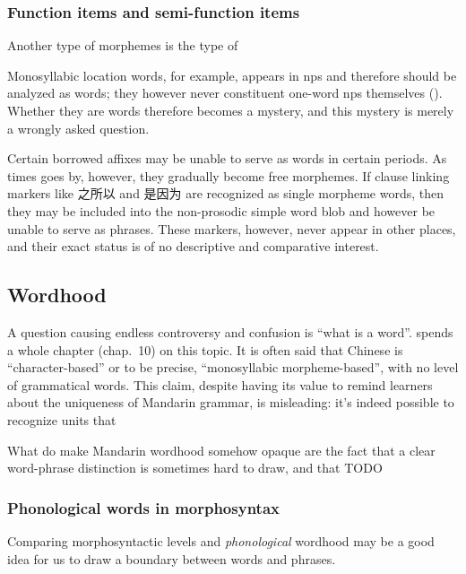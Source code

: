 \documentclass[UTF8, a4paper, oneside, scheme=plain, 12pt]{ctexrep}
\newcommand*{\citechap}[1]{chap.~{#1}}
\begin{document}
\subsubsection{Function items and semi-function items} 

Another type of morphemes is the type of 

Monosyllabic location words, 
for example, appears in \acs{np}s 
and therefore should be analyzed as words;
they however never constituent one-word \acs{np}s themselves
().
Whether they are words therefore becomes a mystery,
and this mystery is merely a wrongly asked question.

Certain borrowed affixes may be unable to serve as words in certain periods.
As times goes by, however, they gradually become free morphemes.
If clause linking markers like 之所以 and 是因为 are recognized as single morpheme words,
then they may be included into the non-prosodic simple word blob 
and however be unable to serve as phrases.
These markers, however, never appear in other places,
and their exact status is of no descriptive and comparative interest.

\subsection{Wordhood}\label{sec:pos.word}

A question causing endless controversy and confusion 
is ``what is a word''. 
\citet{dixon2010basic2} spends a whole chapter (\citechap{10}) on this topic.
It is often said that Chinese is ``character-based''
or to be precise, ``monosyllabic morpheme-based'',
with no level of grammatical words.
This claim, despite having its value 
to remind learners about the uniqueness of Mandarin grammar,
is misleading: 
it's indeed possible to recognize units that 

What do make Mandarin wordhood somehow opaque 
are the fact that a clear word-phrase distinction is sometimes hard to draw, 
and that TODO 

\subsubsection{Phonological words in morphosyntax}\label{sec:pos.word.phonological}

Comparing morphosyntactic levels 
and \emph{phonological} wordhood 
may be a good idea for us to draw a boundary 
between words and phrases.
\end{document}
